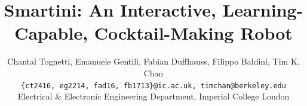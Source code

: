 \documentclass[conference]{IEEEtran}
\begin{document}
%
\title{Smartini: An Interactive, Learning-Capable, Cocktail-Making Robot}


\author{
	Chantal Tognetti, Emanuele Gentili, Fabian Duffhauss, Filippo Baldini, Tim K. Chan\\
	{\tt\small \{ct2416, eg2214, fad16, fb1713\}@ic.ac.uk, timchan@berkeley.edu}\\
	Electrical \& Electronic Engineering Department, Imperial College London\\
}


% 








\maketitle
\end{document}
